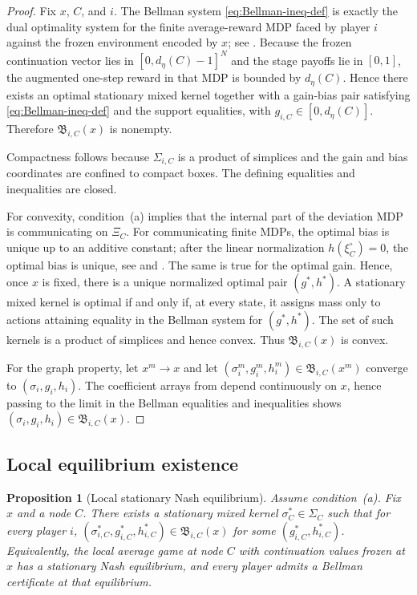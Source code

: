 \documentclass[12pt]{article}
\newtheorem{proposition}[theorem]{Proposition}
\theoremstyle{definition}
\newcommand{\1}{\mathbf{1}}
\begin{document}
\begin{proof}
Fix $x$, $C$, and $i$. The Bellman system
\eqref{eq:Bellman-ineq-def} is exactly the dual optimality system for the finite
average-reward MDP faced by player $i$ against the frozen environment encoded by
$x$; see . Because the frozen continuation vector lies in
$[0,d_\eta(C)-1]^N$ and the stage payoffs lie in $[0,1]$, the augmented one-step
reward in that MDP is bounded by $d_\eta(C)$. Hence there exists an optimal
stationary mixed kernel together with a gain-bias pair satisfying
\eqref{eq:Bellman-ineq-def} and the support equalities, with
$g_{i,C}\in[0,d_\eta(C)]$. Therefore $\mathfrak B_{i,C}(x)$ is nonempty.

Compactness follows because $\Sigma_{i,C}$ is a product of simplices and the gain
and bias coordinates are confined to compact boxes. The defining equalities and
inequalities are closed.

For convexity, condition~\textnormal{(a)} implies that the internal part of the
deviation MDP is communicating on $\Xi_C$. For communicating finite MDPs, the
optimal bias is unique up to an additive constant; after the linear normalization
$h(\xi_C^\circ)=0$, the optimal bias is unique, see
 and \cite[Chapter~8]{Puterman1994}. The same is true for
the optimal gain. Hence, once $x$ is fixed, there is a unique normalized optimal
pair $(g^*,h^*)$. A stationary mixed kernel is optimal if and only if, at every
state, it assigns mass only to actions attaining equality in the Bellman system
for $(g^*,h^*)$. The set of such kernels is a product of simplices and hence
convex. Thus $\mathfrak B_{i,C}(x)$ is convex.

For the graph property, let $x^m\to x$ and let
$(\sigma_i^m,g_i^m,h_i^m)\in \mathfrak B_{i,C}(x^m)$ converge to
$(\sigma_i,g_i,h_i)$. The coefficient arrays from  depend
continuously on $x$, hence passing to the limit in the Bellman equalities and
inequalities shows $(\sigma_i,g_i,h_i)\in\mathfrak B_{i,C}(x)$.
\end{proof}

\subsection{Local equilibrium existence}

\begin{proposition}[Local stationary Nash equilibrium]
\label{prop:local-equilibrium}
Assume condition~\textnormal{(a)}. Fix $x$ and a node $C$. There exists a
stationary mixed kernel $\sigma_C^*\in\Sigma_C$ such that for every player $i$,
$(\sigma_{i,C}^*,g_{i,C}^*,h_{i,C}^*)\in \mathfrak B_{i,C}(x)$ for some
$(g_{i,C}^*,h_{i,C}^*)$. Equivalently, the local average game at node $C$ with
continuation values frozen at $x$ has a stationary Nash equilibrium, and every
player admits a Bellman certificate at that equilibrium.
\end{proposition}
\end{document}
